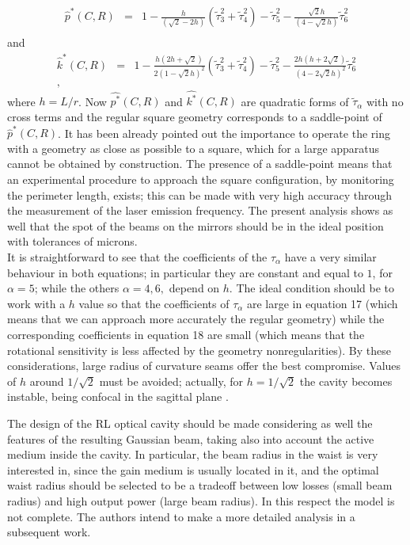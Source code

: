 \documentclass[12pt,a4paper,final]{iopart}
\begin{document}
\begin{eqnarray}
 \widehat p^{*}(C,R) &=& 1-\frac{h}{(\sqrt{2}-2h)} (\widetilde \tau_{3}^{2} + 
\widetilde \tau_{4}^2) -\widetilde \tau_{5}^2 - \frac{\sqrt{2}h}{(4- \sqrt{2}h)} \widetilde \tau_{6}^{2}\\\nonumber
\label{eq:per2ord}
\end{eqnarray}
and
\begin{eqnarray}
\widehat k^{*}(C,R) &=& 1-\frac{h(2h+\sqrt{2})}{2(1- \sqrt{2}h)^2} (\widetilde \tau_{3}^{2} + 
\widetilde \tau_{4}^2) - \widetilde \tau_{5}^2 - \frac{2h(h+2\sqrt{2})}{(4-2 \sqrt{2}h)^2} \widetilde \tau_{6}^{2}\\\nonumber
\label{eq:k2ord},
\end{eqnarray}
where $ h=L/r$.
Now $\widehat{p^{*}}(C,R)$ and $\widehat{k^{*}}(C,R)$ are quadratic 
forms of $\widetilde \tau_{\alpha}$ with no cross terms and the regular square geometry 
corresponds to a saddle-point of $\widehat p^{*}(C,R)$. It has been already pointed out the importance
to operate the ring with a geometry as close as possible to a square, which for a large apparatus cannot be obtained by construction. 
The presence of  a saddle-point means that an experimental procedure to approach the square configuration, by monitoring the perimeter length, exists; this can be made with very high accuracy through the measurement of the laser emission frequency. The present analysis shows as well that the spot of the beams on the mirrors should be in the ideal position with tolerances of microns.\\
It is straightforward to see that the coefficients of the $\tau_\alpha$ have a very similar behaviour in both equations; in particular they are constant and equal to $1$, for $\alpha=5$; while the others $\alpha=4,6,$ depend on $h$. The ideal condition should be to work with a $h$ value so that the coefficients of $\tau_\alpha$ are large in equation 17 (which means that we can approach more accurately the regular geometry) while the corresponding coefficients in equation 18 are small (which means that the rotational sensitivity is less affected by the geometry nonregularities). By these considerations, large radius of 
curvature seams offer the best compromise. Values of $h$ around $1/\sqrt{2}$ must be avoided; actually, for $h =  1/\sqrt{2}$ the cavity becomes instable, being confocal in the sagittal plane \cite{Bilger}.

The design of the RL optical cavity should be made considering as well the features of the
resulting Gaussian beam, taking also into account the active medium inside the cavity. 
In particular, the beam radius in the waist is very interested in,
since the gain medium is usually located in it, and the optimal waist radius
should be selected to be a tradeoff between low losses (small beam radius) and high output
power (large beam radius). In this respect the model is not complete. The authors intend to make a more detailed analysis in a
subsequent work.
\end{document}
